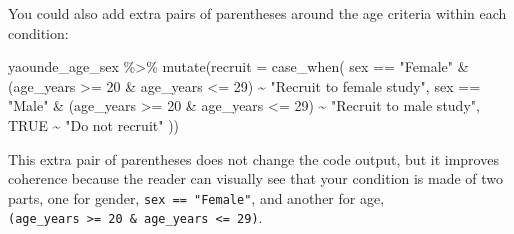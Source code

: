 \documentclass[
  letterpaper,
  DIV=11,
  numbers=noendperiod]{scrreprt}
\newenvironment{Shaded}{\begin{snugshade}}{\end{snugshade}}
\newcommand{\AttributeTok}[1]{\textcolor[rgb]{0.40,0.45,0.13}{#1}}
\newcommand{\ConstantTok}[1]{\textcolor[rgb]{0.56,0.35,0.01}{#1}}
\newcommand{\DecValTok}[1]{\textcolor[rgb]{0.68,0.00,0.00}{#1}}
\newcommand{\FunctionTok}[1]{\textcolor[rgb]{0.28,0.35,0.67}{#1}}
\newcommand{\NormalTok}[1]{\textcolor[rgb]{0.00,0.23,0.31}{#1}}
\newcommand{\SpecialCharTok}[1]{\textcolor[rgb]{0.37,0.37,0.37}{#1}}
\newcommand{\StringTok}[1]{\textcolor[rgb]{0.13,0.47,0.30}{#1}}
\begin{document}
You could also add extra pairs of parentheses around the age criteria
within each condition:

\begin{Shaded}
\begin{Highlighting}[]
\NormalTok{yaounde\_age\_sex }\SpecialCharTok{\%\textgreater{}\%}
  \FunctionTok{mutate}\NormalTok{(}\AttributeTok{recruit =} \FunctionTok{case\_when}\NormalTok{(}
\NormalTok{    sex }\SpecialCharTok{==} \StringTok{"Female"} \SpecialCharTok{\&}\NormalTok{ (age\_years }\SpecialCharTok{\textgreater{}=} \DecValTok{20} \SpecialCharTok{\&}\NormalTok{ age\_years }\SpecialCharTok{\textless{}=} \DecValTok{29}\NormalTok{) }\SpecialCharTok{\textasciitilde{}} \StringTok{"Recruit to female study"}\NormalTok{,}
\NormalTok{    sex }\SpecialCharTok{==} \StringTok{"Male"} \SpecialCharTok{\&}\NormalTok{ (age\_years }\SpecialCharTok{\textgreater{}=} \DecValTok{20} \SpecialCharTok{\&}\NormalTok{ age\_years }\SpecialCharTok{\textless{}=} \DecValTok{29}\NormalTok{) }\SpecialCharTok{\textasciitilde{}} \StringTok{"Recruit to male study"}\NormalTok{,}
    \ConstantTok{TRUE} \SpecialCharTok{\textasciitilde{}} \StringTok{"Do not recruit"}
\NormalTok{  ))}
\end{Highlighting}
\end{Shaded}

This extra pair of parentheses does not change the code output, but it
improves coherence because the reader can visually see that your
condition is made of two parts, one for gender,
\texttt{sex\ ==\ "Female"}, and another for age,
\texttt{(age\_years\ \textgreater{}=\ 20\ \&\ age\_years\ \textless{}=\ 29)}.
\end{document}
